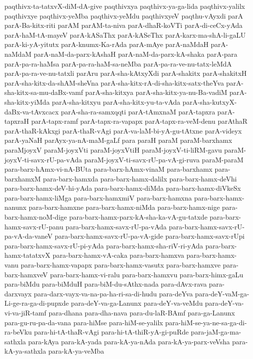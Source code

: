 {paqthivx-ta-tatxvX-diM-dA-give
paqthivxya
paqthivx-ya-ga-lida
paqthivx-yalilx
paqthivxye
paqthivx-yeMba
paqthivx-yeMdu
paqthivxyeV
paqthu-vAyxdi
parA
parA-Ba-kitx-riti
parAM
parAM-ta-niva
parA-dhaR-koVTi
parA-di-ceCx-yAda
parA-haM-tA-mayeV
parA-kASaThx
parA-kASeThx
parA-karx-ma-shA-li-gaLU
parA-ki-yA-yitutx
parA-knumx-Ka-rAda
parA-mAye
parA-naMdaH
parA-naMdaM
parA-naM-da-parx-kAshaH
parA-naM-da-parx-kA-shaka
parA-para
parA-pa-ra-haMsa
parA-pa-ra-haM-sa-neMba
parA-pa-ra-ve-nu-tatx-leMdA
parA-pa-ra-ve-nu-tatxli
parAru
parA-sha-kAtxyXdi
parA-shakitx
parA-shakitxH
parA-sha-kitx-da-shAM-sheVna
parA-sha-kitx-rA-di-sha-kitx-satx-theYva
parA-sha-kitx-sa-mu-daBx-vamf
parA-sha-kitxya
parA-sha-kitx-ya-nu-Ba-vadiM
parA-sha-kitx-yiMda
parA-sha-kitxyu
parA-sha-kitx-yu-ta-vAda
parA-sha-kutxyX-daBx-va-tAvxcacx
parA-sha-ra-samxqqti
parA-tAmxnaM
parA-tapxra
parA-tapxraH
parA-tapx-ramf
parA-tapx-ra-vapapx
parA-tapx-ra-veM-denu
parAthaR
parA-thaR-kAkxgi
parA-thaR-vAgi
parA-va-laM-bi-yA-gu-tAtxne
parA-videyx
parA-yaNaH
parAyx-ya-nA-maM-gaLf
para
paraH
paraM
paraM-barxhamx
paraMjoyxV
paraM-joyxVti
paraM-joyxVtiH
paraM-joyxV-ti-liRM-gavu
paraM-joyxV-ti-savx-rU-pa-vAda
paraM-joyxV-ti-savx-rU-pa-vA-gi-ruva
paraM-paraM
para-barx-hAmx-vi-nA-BUta
para-barx-hAmx-vinaM
para-barxhamx
para-barxhamxM
para-barx-hamxda
para-barx-hamx-dalilx
para-barx-hamx-deVhi
para-barx-hamx-deV-hi-yAda
para-barx-hamx-diMda
para-barx-hamx-diVkeSx
para-barx-hamx-liMga
para-barx-hamxmiV
para-barx-hamxna
para-barx-hamx-nanunx
para-barx-hamxne
para-barx-hamx-niMda
para-barx-hamx-nige
para-barx-hamx-noM-dige
para-barx-hamx-parx-kA-sha-ka-vA-gu-tatxde
para-barx-hamx-savx-rU-panu
para-barx-hamx-savx-rU-pa-vAda
para-barx-hamx-savx-rU-pa-vA-da-vaneV
para-barx-hamx-savx-rU-pa-vA-gide
para-barx-hamx-savx-rUpi
para-barx-hamx-savx-rU-pi-yAda
para-barx-hamx-sha-riV-ri-yAda
para-barx-hamx-tatatxvX
para-barx-hamx-vA-caka
para-barx-hamxva
para-barx-hamx-vanu
para-barx-hamx-vapapx
para-barx-hamx-vasutx
para-barx-hamxve
para-barx-hamxveV
para-barx-hamx-vi-ralu
para-barx-hamxvu
para-barx-himx-gaLu
para-biMdu
para-biMduH
para-biM-du-sAthx-nada
para-dAvx-rava
para-darxvayx
para-darx-vayx-va-na-pa-ha-ri-sa-di-hudu
para-deYva
para-deY-vaM-ga-Li-ge-ra-ga-di-pupxde
para-deY-va-ga-Lanunx
para-deY-va-veMdu
para-deY-va-vi-va-jiR-tamf
para-dhana
para-dha-nava
para-du-laR-BAmf
para-ga-Lanunx
para-gu-ru-pa-da-vana
para-hiMse
para-hiM-se-yalilx
para-hiM-se-ya-ne-sa-ga-di-ra-beVku
para-hi-tA-thaR-vAgi
para-hi-tA-thiR-yA-gi-puRde
para-jaM-ga-ma-sathxla
para-kAya
para-kA-yada
para-kA-ya-nAda
para-kA-ya-parx-veVsha
para-kA-ya-sathxla
para-kA-ya-veMba
}
